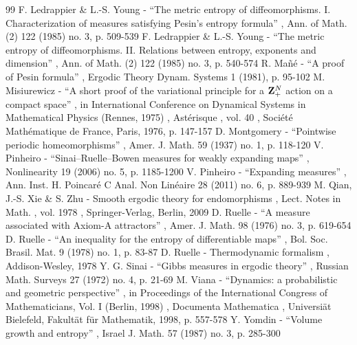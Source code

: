 \documentclass[11pt]{article}
\theoremstyle{definition}
\begin{document}
\begin{thebibliography}{99}
 F. Ledrappier \& L.-S. Young - “The metric entropy of diffeomorphisms. I. Characterization of measures satisfying Pesin’s entropy formula” , Ann. of Math. (2) 122 (1985) no. 3, p. 509-539
 F. Ledrappier \& L.-S. Young - “The metric entropy of diffeomorphisms. II. Relations between entropy, exponents and dimension” , Ann. of Math. (2) 122 (1985) no. 3, p. 540-574
 R. Mañé - “A proof of Pesin formula” , Ergodic Theory Dynam. Systems 1 (1981), p. 95-102
 M. Misiurewicz - “A short proof of the variational principle for a ${\bf Z}_{+}^{N}$ action on a compact space” , in International Conference on Dynamical Systems in Mathematical Physics (Rennes, 1975) , Astérisque , vol. 40 , Société Mathématique de France, Paris, 1976, p. 147-157
 D. Montgomery - “Pointwise periodic homeomorphisms” , Amer. J. Math. 59 (1937) no. 1, p. 118-120
 V. Pinheiro - “Sinai–Ruelle–Bowen measures for weakly expanding maps” , Nonlinearity 19 (2006) no. 5, p. 1185-1200
 V. Pinheiro - “Expanding measures” , Ann. Inst. H. Poincaré C Anal. Non Linéaire 28 (2011) no. 6, p. 889-939
 M. Qian, J.-S. Xie \& S. Zhu - Smooth ergodic theory for endomorphisms , Lect. Notes in Math. , vol. 1978 , Springer-Verlag, Berlin, 2009
 D. Ruelle - “A measure associated with Axiom-A attractors” , Amer. J. Math. 98 (1976) no. 3, p. 619-654
 D. Ruelle - “An inequality for the entropy of differentiable maps” , Bol. Soc. Brasil. Mat. 9 (1978) no. 1, p. 83-87
 D. Ruelle - Thermodynamic formalism , Addison-Wesley, 1978
 Y. G. Sinai - “Gibbs measures in ergodic theory” , Russian Math. Surveys 27 (1972) no. 4, p. 21-69
 M. Viana - “Dynamics: a probabilistic and geometric perspective” , in Proceedings of the International Congress of Mathematicians, Vol. I (Berlin, 1998) , Documenta Mathematica , Universiät Bielefeld, Fakultät für Mathematik, 1998, p. 557-578
 Y. Yomdin - “Volume growth and entropy” , Israel J. Math. 57 (1987) no. 3, p. 285-300
\end{thebibliography}
\end{document}
